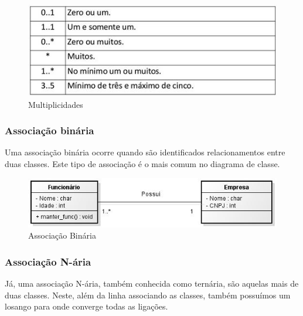 \begin{figure}[H]
	\centering
	\includegraphics[scale=0.8]{imagens/multiplicidade.jpg}
	\caption{Multiplicidades}
	\label{fig:multiplicidades}
\end{figure}

\subsubsection{Associação binária} 

Uma associação binária ocorre quando são identificados relacionamentos entre duas classes. Este tipo de associação é o mais comum no diagrama de classe.

\begin{figure}[H]
	\centering
	\includegraphics[scale=0.8]{imagens/associacaobinaria.jpg}
	\caption{Associação Binária}
	\label{fig:assbinaria}
\end{figure}

\subsubsection{Associação N-ária}

Já, uma associação N-ária, também conhecida como ternária, são aquelas mais de duas classes. Neste, além da linha associando as classes, também possuímos um losango para onde converge todas as ligações. 

